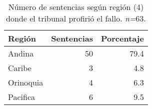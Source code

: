 \begin{table}[!htbp]
\centering
\caption{Número de sentencias según región (4) donde el tribunal profirió el fallo. \textit{n=}63.} 
\label{tab:regfal}
\begin{tabular}{lrr}
  \hline
Región & Sentencias & Porcentaje \\ 
  \hline
Andina & 50 & 79.4 \\ 
  Caribe &  3 & 4.8 \\ 
  Orinoquia &  4 & 6.3 \\ 
  Pacifica &  6 & 9.5 \\ 
   \hline
\end{tabular}
\end{table}
